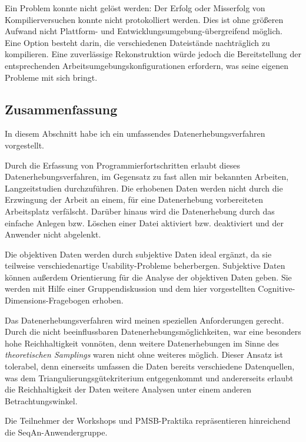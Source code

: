 Ein Problem konnte nicht gelöst werden: Der Erfolg oder Misserfolg von Kompilierversuchen konnte nicht protokolliert werden. Dies ist ohne größeren Aufwand nicht Plattform- und Entwicklungsumgebung-übergreifend möglich. Eine Option besteht darin, die verschiedenen Dateistände nachträglich zu kompilieren. Eine zuverlässige Rekonstruktion würde jedoch die Bereitstellung der entsprechenden Arbeitsumgebungskonfigurationen erfordern, was seine eigenen Probleme mit sich bringt.



\subsection{Zusammenfassung}
\label{sec:phase2-fazit}

In diesem Abschnitt habe ich ein umfassendes Datenerhebungsverfahren vorgestellt.

Durch die Erfassung von Programmierfortschritten erlaubt dieses Datenerhebungsverfahren, im Gegensatz zu fast allen mir bekannten Arbeiten, Langzeitstudien durchzuführen. Die erhobenen Daten werden nicht durch die Erzwingung der Arbeit an einem, für eine Datenerhebung vorbereiteten Arbeitsplatz verfälscht. Darüber hinaus wird die Datenerhebung durch das einfache Anlegen bzw. Löschen einer Datei aktiviert bzw. deaktiviert und der Anwender nicht abgelenkt.

Die objektiven Daten werden durch subjektive Daten ideal ergänzt, da sie teilweise verschiedenartige Usability-Probleme beherbergen. Subjektive Daten können außerdem Orientierung für die Analyse der objektiven Daten geben. Sie werden mit Hilfe einer Gruppendiskussion und dem hier vorgestellten Cognitive-Dimensions-Fragebogen erhoben.

Das Datenerhebungsverfahren wird meinen speziellen Anforderungen gerecht. Durch die nicht beeinflussbaren Datenerhebungsmöglichkeiten, war eine besonders hohe Reichhaltigkeit vonnöten, denn weitere Datenerhebungen im Sinne des \textit{theoretischen Samplings} waren nicht ohne weiteres möglich. Dieser Ansatz ist tolerabel, denn einerseits umfassen die Daten bereits verschiedene Datenquellen, was dem Triangulierungsgütekriterium entgegenkommt und andererseits erlaubt die Reichhaltigkeit der Daten weitere Analysen unter einem anderen Betrachtungswinkel. 

Die Teilnehmer der Workshops und PMSB-Praktika repräsentieren hinreichend die SeqAn-Anwendergruppe.

